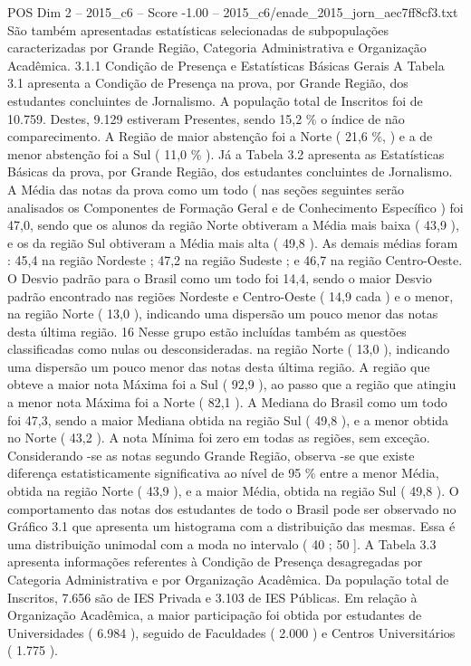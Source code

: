 \begin{textsample}{POS Dim 2 – 2015\_c6 – Score -1.00 – 2015\_c6/enade\_2015\_jorn\_aec7ff8cf3.txt}
São também apresentadas estatísticas selecionadas de subpopulações caracterizadas por Grande Região, Categoria Administrativa e Organização Acadêmica. 3.1.1 Condição de Presença e Estatísticas Básicas Gerais A Tabela 3.1 apresenta a Condição de Presença na prova, por Grande Região, dos estudantes concluintes de Jornalismo.
A população total de Inscritos foi de 10.759.
Destes, 9.129 estiveram Presentes, sendo 15,2 \% o índice de não comparecimento.
A Região de maior abstenção foi a Norte ( 21,6 \%, ) e a de menor abstenção foi a Sul ( 11,0 \% ).
Já a Tabela 3.2 apresenta as Estatísticas Básicas da prova, por Grande Região, dos estudantes concluintes de Jornalismo.
A Média das notas da prova como um todo ( nas seções seguintes serão analisados os Componentes de Formação Geral e de Conhecimento Específico ) foi 47,0, sendo que os alunos da região Norte obtiveram a Média mais baixa ( 43,9 ), e os da região Sul obtiveram a Média mais alta ( 49,8 ).
As demais médias foram : 45,4 na região Nordeste ; 47,2 na região Sudeste ; e 46,7 na região Centro-Oeste.
O Desvio padrão para o Brasil como um todo foi 14,4, sendo o maior Desvio padrão encontrado nas regiões Nordeste e Centro-Oeste ( 14,9 cada ) e o menor, na região Norte ( 13,0 ), indicando uma dispersão um pouco menor das notas desta última região. 16 Nesse grupo estão incluídas também as questões classificadas como nulas ou desconsideradas. na região Norte ( 13,0 ), indicando uma dispersão um pouco menor das notas desta última região.
A região que obteve a maior nota Máxima foi a Sul ( 92,9 ), ao passo que a região que atingiu a menor nota Máxima foi a Norte ( 82,1 ).
A Mediana do Brasil como um todo foi 47,3, sendo a maior Mediana obtida na região Sul ( 49,8 ), e a menor obtida no Norte ( 43,2 ).
A nota Mínima foi zero em todas as regiões, sem exceção.
Considerando -se as notas segundo Grande Região, observa -se que existe diferença estatisticamente significativa ao nível de 95 \% entre a menor Média, obtida na região Norte ( 43,9 ), e a maior Média, obtida na região Sul ( 49,8 ).
O comportamento das notas dos estudantes de todo o Brasil pode ser observado no Gráfico 3.1 que apresenta um histograma com a distribuição das mesmas.
Essa é uma distribuição unimodal com a moda no intervalo ( 40 ; 50 ].
A Tabela 3.3 apresenta informações referentes à Condição de Presença desagregadas por Categoria Administrativa e por Organização Acadêmica.
Da população total de Inscritos, 7.656 são de IES Privada e 3.103 de IES Públicas.
Em relação à Organização Acadêmica, a maior participação foi obtida por estudantes de Universidades ( 6.984 ), seguido de Faculdades ( 2.000 ) e Centros Universitários ( 1.775 ).

\end{textsample}
